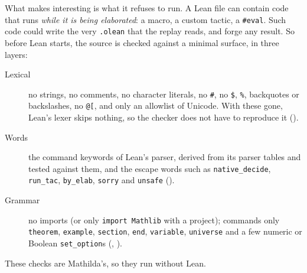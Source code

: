 What makes  interesting is what it refuses to run. A Lean file can
contain code that runs \emph{while it is being elaborated}: a macro, a custom tactic, a
\texttt{\#eval}. Such code could write the very \texttt{.olean} that the replay reads,
and forge any result. So before Lean starts, the source is checked against a minimal
surface, in three layers:
\begin{description}
\item[Lexical] no strings, no comments, no character literals, no \texttt{\#}, no
  \texttt{\$}, \texttt{\%}, backquotes or backslashes, no \texttt{@[}, and only an
  allowlist of Unicode. With these gone, Lean's lexer skips nothing, so the checker
  does not have to reproduce it ().
\item[Words] the command keywords of Lean's parser, derived from its parser tables and
  tested against them, and the escape words such as \texttt{native\_decide},
  \texttt{run\_tac}, \texttt{by\_elab}, \texttt{sorry} and \texttt{unsafe}
  ().
\item[Grammar] no imports (or only \texttt{import Mathlib} with a project); commands
  only \texttt{theorem}, \texttt{example}, \texttt{section}, \texttt{end},
  \texttt{variable}, \texttt{universe} and a few numeric or Boolean
  \texttt{set\_option}s (, ).
\end{description}
These checks are Mathilda's, so they run without Lean.

\begin{codepairs}
\end{codepairs}

